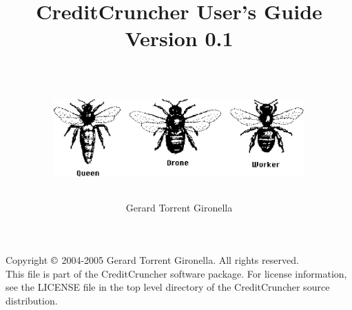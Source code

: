 
%
%
%
%
%
%
%
%

\title{CreditCruncher User's Guide \\
Version 0.1 \\
\ \\
\centerline{\includegraphics[height=3cm, angle=0]{threebees.eps}}
}

\author{Gerard Torrent Gironella}

\maketitle

\thispagestyle{empty}

\newpage

\vspace*{8in}

\noindent Copyright $\copyright$ 2004-2005 Gerard Torrent Gironella.  All rights reserved. \\

\noindent This file is part of the CreditCruncher software package.  For
license information, see the LICENSE file in the top level directory
of the CreditCruncher source distribution. \\
